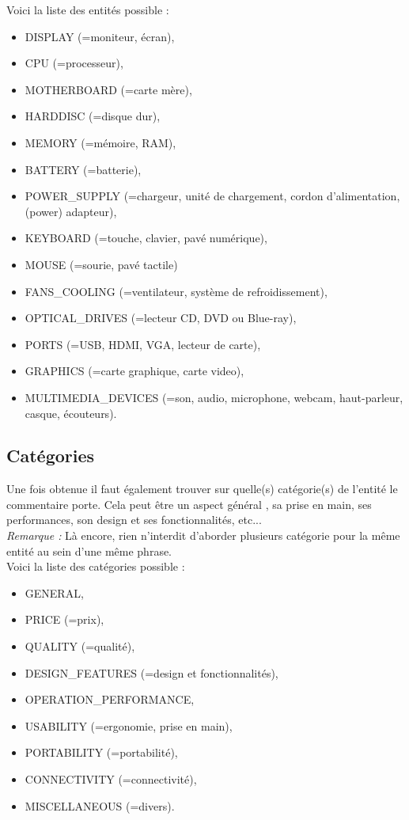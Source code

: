 \documentclass[12pt ,a4paper ]{article}
\begin{document}
\begin{multicols}{2}
\noindent Voici la liste des entités possible : 
\begin{itemize}
\item DISPLAY (=moniteur, écran), 
\item CPU (=processeur), 
\item MOTHERBOARD (=carte mère),
\item HARDDISC (=disque dur), 
\item MEMORY (=mémoire, RAM), 
\item BATTERY (=batterie), 
\item POWER\_SUPPLY (=chargeur, unité de chargement, cordon d'alimentation, (power) adapteur),
\item KEYBOARD (=touche, clavier, pavé numérique), 
\item MOUSE (=sourie, pavé tactile)
\item FANS\_COOLING (=ventilateur, système de refroidissement), 
\item OPTICAL\_DRIVES (=lecteur CD, DVD ou Blue-ray),
\item PORTS (=USB, HDMI, VGA, lecteur de carte),
\item GRAPHICS (=carte graphique, carte video),
\item MULTIMEDIA\_DEVICES (=son, audio, microphone, webcam, haut-parleur, casque, écouteurs).
\end{itemize}				

\subsection{Catégories}
\noindent Une fois obtenue il faut également trouver sur quelle(s) catégorie(s) de l'entité le commentaire porte. Cela peut être un aspect général , sa prise en main, ses performances, son design et ses fonctionnalités, etc... \\

\noindent\textit{Remarque : }Là encore, rien n'interdit d'aborder plusieurs catégorie pour la même entité au sein d'une même phrase.\\

\noindent Voici la liste des catégories possible : 
\begin{itemize}
\item GENERAL, 
\item PRICE (=prix), 
\item QUALITY (=qualité), 
\item DESIGN\_FEATURES (=design et fonctionnalités),
\item OPERATION\_PERFORMANCE, 
\item USABILITY (=ergonomie, prise en main), 
\item PORTABILITY (=portabilité),
\item CONNECTIVITY (=connectivité), 
\item MISCELLANEOUS (=divers).
\end{itemize}	


\end{multicols}
\end{document}
